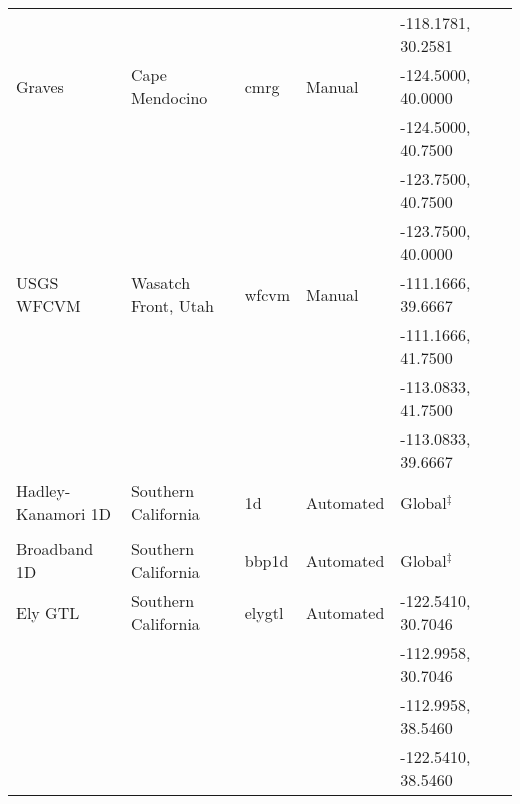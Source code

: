\begin{table*}
\begin{tabular}[]{llllll}
                   &                       &               &              & -118.1781, 30.2581 &                              \\
Graves             & Cape Mendocino        & cmrg          &  Manual      & -124.5000, 40.0000 & \citet{Graves_1994_SSA}      \\
                   &                       &               &              & -124.5000, 40.7500 &                              \\
                   &                       &               &              & -123.7500, 40.7500 &                              \\
                   &                       &               &              & -123.7500, 40.0000 &                              \\
USGS WFCVM         & Wasatch Front, Utah   & wfcvm         &  Manual      & -111.1666, 39.6667 & \citet{Magistrale_2006_Tech} \\
                   &                       &               &              & -111.1666, 41.7500 &                              \\
                   &                       &               &              & -113.0833, 41.7500 &                              \\
                   &                       &               &              & -113.0833, 39.6667 &                              \\
Hadley-Kanamori 1D & Southern California   & 1d            &  Automated   & Global$^\ddagger$  & \citet{Kanamori_1975_Chap}   \\
                   &                       &               &              &                    & \citet{Hadley_1977_GSAB}     \\
Broadband 1D       & Southern California   & bbp1d         &  Automated   & Global$^\ddagger$  & \citet{Graves_2010_BSSA}     \\
\hline
Ely GTL            & Southern California   & elygtl        &  Automated   & -122.5410, 30.7046 & \citet{Ely_2010_AGU}         \\
                   &                       &               &              & -112.9958, 30.7046 &                              \\
                   &                       &               &              & -112.9958, 38.5460 &                              \\
                   &                       &               &              & -122.5410, 38.5460 &                              \\

\end{tabular}
\end{table*}

